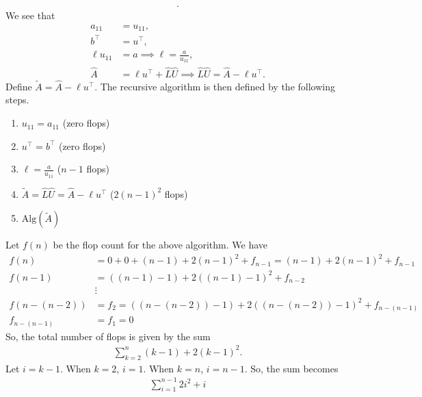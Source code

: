 \documentclass{report}
\begin{document}
\begin{itemize}
\begin{align*}
            .\end{align*}
            We see that
            \begin{align*}
                a_{11} &= u_{11}, \\
                b^{\top} &= u^{\top}, \\
                \ell u_{11} &= a \implies \ell = \frac{a}{u_{11}}, \\
                \hat{A} &= \ell u^{\top} + \hat{L}\hat{U} \implies \hat{L}\hat{U} = \hat{A} - \ell u^{\top}
            .\end{align*}
            Define $\tilde{A} = \hat{A} - \ell u^{\top}$. 
            The recursive algorithm is then defined by the following steps.
            \begin{enumerate}
                \item $u_{11} = a_{11} $ (zero flops)
                \item $u^{\top} = b^{\top} $ (zero flops)
                \item $\ell = \frac{a}{u_{11}} $ ($n-1$ flops) 
                \item $\tilde{A} = \hat{L}\hat{U} = \hat{A} - \ell u^{\top} $ ($2(n-1)^{2}$ flops)
                \item $\text{Alg}(\tilde{A})$
            \end{enumerate}
            Let $f(n)$ be the flop count for the above algorithm. We have
            \begin{align*}
                f(n) &= 0 + 0  + (n-1) + 2(n-1)^{2} + f_{n-1} = (n-1) + 2(n-1)^{2} + f_{n-1}\\
                f(n-1) &= ((n-1) - 1) + 2((n-1)-1)^{2} + f_{n-2} \\
                       &\vdots \\
                f(n-(n-2)) &= f_{2} = ((n-(n-2))-1) + 2((n-(n-2))-1)^{2} + f_{n-(n-1)} \\
                f_{n-(n-1)} &= f_{1} = 0 
            \end{align*}
            So, the total number of flops is given by the sum
            \begin{align*}
                \sum_{k=2}^{n} (k-1) + 2(k-1)^{2}
            .\end{align*}
            Let $ i = k-1 $. When  $k=2$, $i = 1$. When $k=n$, $i = n-1$. So, the sum becomes
            \begin{align*}
                \sum_{i=1}^{n-1} 2i^{2} + i
            \end{align*}

\end{itemize}
\end{document}
